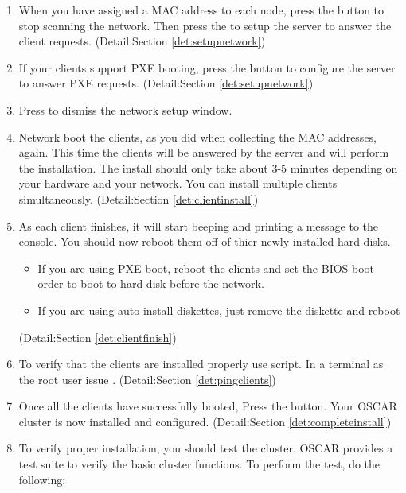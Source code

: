 \begin {enumerate}
\item When you have assigned a MAC address to each node, press the 
button to stop scanning the network. Then press the 
to setup the server to answer the client requests.
(Detail:Section \ref{det:setupnetwork})

\item If your clients support PXE booting, press the  
button to configure the server to answer PXE requests.
(Detail:Section \ref{det:setupnetwork})

\item Press  to dismiss the network setup window.

\item Network boot the clients, as you did when collecting the MAC addresses,
again. This time the clients will be answered by the server and will perform
the installation. The install should only take about 3-5 minutes depending on 
your hardware and your network. You can install multiple clients simultaneously.
(Detail:Section \ref{det:clientinstall})

\item As each client finishes, it will start beeping and printing a message to the 
console. You should now reboot them off of thier newly installed hard disks.

        \begin{itemize}
        \item If you are using PXE boot, reboot the clients and set the BIOS
        boot order to boot to hard disk before the network.
        \item If you are using auto install diskettes, just remove the diskette
        and reboot
        \end{itemize}
(Detail:Section \ref{det:clientfinish})

\item To verify that the clients are installed properly use
   script.  In a terminal as the root user issue
  .
  (Detail:Section \ref{det:pingclients})

\item Once all the clients have successfully booted, Press the 
 button. Your OSCAR cluster is
now installed and configured.
(Detail:Section \ref{det:completeinstall})

\item To verify proper installation, you should test the cluster.
OSCAR provides a test suite to verify the basic cluster
functions. To perform the test, do the following:


\end{enumerate}
